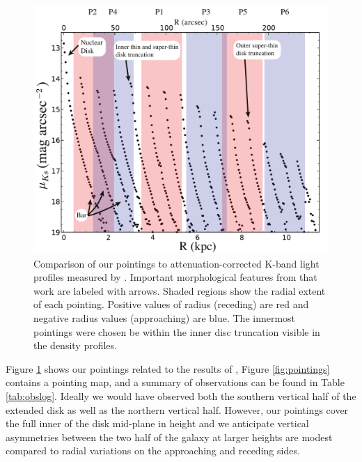 \begin{figure}
  \centering
  \includegraphics[width=\columnwidth]{891_1/figs/ASR_pointings.pdf}
  \caption{\label{fig:ASR_comp}\fixspacing Comparison of our \GP
    pointings to attenuation-corrected K-band light profiles measured
    by \citet{Schechtman-Rook13}. Important morphological features
    from that work are labeled with arrows. Shaded regions show the
    radial extent of each \GP pointing. Positive values of radius
    (receding) are red and negative radius values (approaching) are
    blue. The innermost \GP pointings were chosen be within the inner
    disc truncation visible in the density profiles.}
\end{figure}

Figure \ref{fig:ASR_comp} shows our \GP pointings related to the
results of \citet{Schechtman-Rook13}, Figure \ref{fig:pointings}
contains a pointing map, and a summary of observations can be found in
Table \ref{tab:obslog}. Ideally we would have observed both the
southern vertical half of the extended disk as well as the northern
vertical half. However, our pointings cover the full inner
 of the disk mid-plane in height and we anticipate
vertical asymmetries between the two half of the galaxy at larger
heights are modest compared to radial variations on the approaching
and receding sides.


